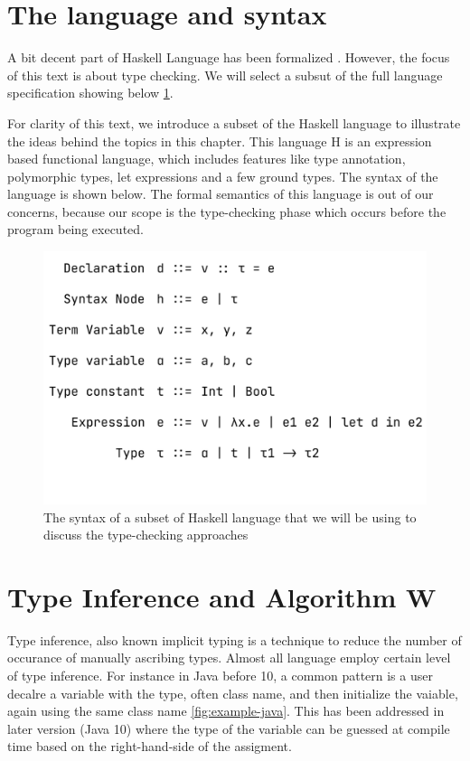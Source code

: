 \section{The language and syntax}

A bit decent part of Haskell Language has been formalized  \cite{FaxEn2002-nd}. However, the focus of this text is about type checking. We will select a subsut of the full language specification showing below \ref{fig:language-specs-minimal}.



For clarity of this text, we introduce a subset of the Haskell language to illustrate the ideas behind the topics in this chapter. This language H is  an expression based functional language, which includes features like type annotation, polymorphic types, let expressions and a few ground types. The syntax of the language is shown below. The formal semantics of this language is  out of our concerns, because our scope is the type-checking phase which occurs before the program being executed.

\begin{figure}[hbt]
    \includegraphics[width=\linewidth]{LanguageSyntax}
    \caption{
      \label{fig:language-specs-minimal}
      The syntax of a subset of Haskell language that we will be using to discuss the type-checking approaches
      }
  \end{figure}



\section{Type Inference and Algorithm W}


Type inference, also known implicit typing is a technique to reduce the number of occurance of manually ascribing types. Almost all language employ certain level of type inference. For instance in Java before 10, a common pattern is a user decalre a variable with the type, often class name, and then initialize the vaiable, again using the same class name \ref{fig:example-java}. This has been addressed in later version (Java 10) where the type of the variable can be guessed at compile time based on the right-hand-side of the assigment.  

